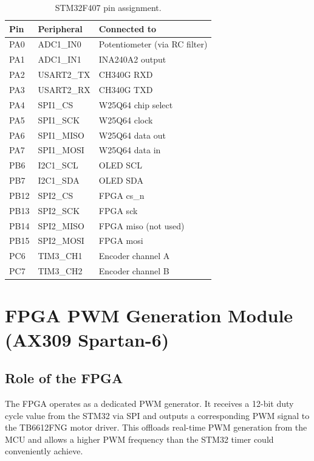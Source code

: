 \documentclass[12pt, a4paper]{report}
\begin{document}
\begin{table}[H]
    \centering
    \caption{STM32F407 pin assignment.}
    \label{tab:pins}
    \begin{tabular}{lll}
        \toprule
        \textbf{Pin} & \textbf{Peripheral} & \textbf{Connected to} \\
        \midrule
        PA0  & ADC1\_IN0   & Potentiometer (via RC filter) \\
        PA1  & ADC1\_IN1   & INA240A2 output \\
        PA2  & USART2\_TX  & CH340G RXD \\
        PA3  & USART2\_RX  & CH340G TXD \\
        PA4  & SPI1\_CS    & W25Q64 chip select \\
        PA5  & SPI1\_SCK   & W25Q64 clock \\
        PA6  & SPI1\_MISO  & W25Q64 data out \\
        PA7  & SPI1\_MOSI  & W25Q64 data in \\
        PB6  & I2C1\_SCL   & OLED SCL \\
        PB7  & I2C1\_SDA   & OLED SDA \\
        PB12 & SPI2\_CS    & FPGA cs\_n \\
        PB13 & SPI2\_SCK   & FPGA sck \\
        PB14 & SPI2\_MISO  & FPGA miso (not used) \\
        PB15 & SPI2\_MOSI  & FPGA mosi \\
        PC6  & TIM3\_CH1   & Encoder channel A \\
        PC7  & TIM3\_CH2   & Encoder channel B \\
        \bottomrule
    \end{tabular}
\end{table}

\section{FPGA PWM Generation Module (AX309 Spartan-6)}

\subsection{Role of the FPGA}

The FPGA operates as a dedicated PWM generator. It receives a 12-bit duty
cycle value from the STM32 via SPI and outputs a corresponding PWM signal
to the TB6612FNG motor driver. This offloads real-time PWM generation from
the MCU and allows a higher PWM frequency than the STM32 timer could
conveniently achieve.
\end{document}
